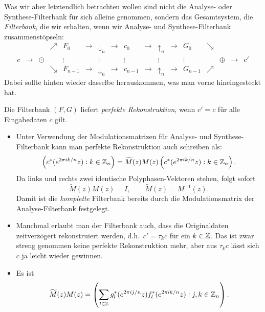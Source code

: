 Was wir aber letztendlich betrachten wollen sind nicht die Analyse- oder Synthese-Filterbank für 
sich alleine genommen, sondern das Gesamtsystem, die \emph{Filterbank}, die wir erhalten, wenn wir
Analyse- und Synthese-Filterbank zusammenstöpseln:
\[
  \begin{array}{*{17}{c}}
    & & & \nearrow & \boxed{F_{0}} & \rightarrow & \boxed{\downarrow_{n}} & \rightarrow & c_{0} 
        & \rightarrow & \boxed{\uparrow_{n}} & \rightarrow & \boxed{G_{0}} & \searrow & & \\
    c & \rightarrow & \odot & & \vdots & & \vdots & & \vdots 
        & & \vdots & & \vdots & & \oplus & \rightarrow & c' \\
    & & & \searrow & \boxed{F_{n-1}} & \rightarrow & \boxed{\downarrow_{n}} & \rightarrow & c_{n-1}
        & \rightarrow & \boxed{\uparrow_{n}} & \rightarrow & \boxed{G_{n-1}} & \nearrow & &
  \end{array}
\]
Dabei sollte hinten wieder dasselbe herauskommen, was man vorne hineingesteckt hat.

\begin{definition}
Die Filterbank $ (F,G) $ liefert \emph{perfekte Rekonstruktion}, wenn $ c' = c $ für alle
Eingabedaten $ c $ gilt.
\end{definition}

\begin{remark}\leavevmode
\begin{itemize}
\item Unter Verwendung der Modulationsmatrizen für Analyse- und Synthese-Filterbank kann man
  perfekte Rekonstruktion auch schreiben als:
  \[
      \left( c^{*}(e^{2\pi ik/n}z) : k \in \mathbb{Z}_{n} \right)
    = \widetilde{M}(z) M(z)
      \left( c^{*}(e^{2\pi ik/n}z) : k \in \mathbb{Z}_{n} \right).
  \]
  Da links und rechts zwei identische Polyphasen-Vektoren stehen, folgt sofort
  \[
    \widetilde{M}(z) M(z) = I, \qquad \widetilde{M}(z) = M^{-1}(z).
  \]
  Damit ist die \emph{komplette} Filterbank bereits durch die Modulationsmatrix der
  Analyse-Filterbank festgelegt.
\item Manchmal erlaubt man der Filterbank auch, dass die Originaldaten zeitverzögert rekonstruiert
  werden, d.h.\ $ c' = \tau_{k} c $ für ein $ k \in \mathbb{Z} $. Das ist zwar streng genommen keine
  perfekte Rekonstruktion mehr, aber aus $ \tau_{k} c $ lässt sich $ c $ ja leicht wieder gewinnen.
\item Es ist
  \[
    \widetilde{M}(z) M(z) =
    \left( 
      \sum_{l \in \mathbb{Z}} g_{l}^{*}(e^{2\pi ij/n}z) f_{l}^{*}(e^{2\pi ik/n}z) : j,k \in \mathbb{Z}_{n}
    \right).
  \]
\end{itemize}
\end{remark}

